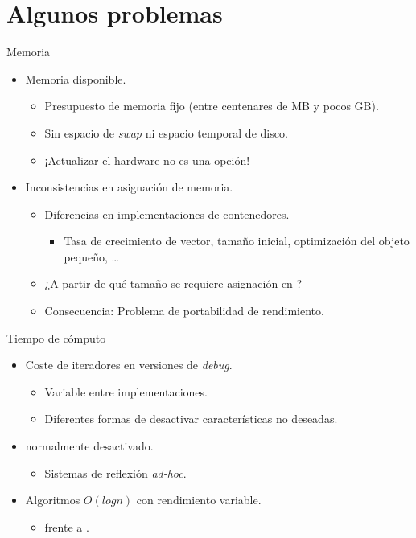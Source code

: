 \section{Algunos problemas}

\begin{frame}[t]{Memoria}
\begin{itemize}
  \item Memoria disponible.
    \begin{itemize}
      \item Presupuesto de memoria fijo (entre centenares de MB y pocos GB).
      \item Sin espacio de \emph{swap} ni espacio temporal de disco.
      \item \alert{¡Actualizar el hardware no es una opción!}
    \end{itemize}
  \vfill\pause
  \item Inconsistencias en asignación de memoria.
    \begin{itemize}
      \item Diferencias en implementaciones de contenedores.
        \begin{itemize}
          \item Tasa de crecimiento de vector, tamaño inicial, optimización del objeto pequeño, \ldots
        \end{itemize}
      \item ¿A partir de qué tamaño se requiere asignación en ?
      \item Consecuencia: Problema de \alert{portabilidad de rendimiento}.
    \end{itemize}
\end{itemize}
\end{frame}

\begin{frame}[t]{Tiempo de cómputo}
\begin{itemize}
  \item Coste de iteradores en versiones de \emph{debug}.
    \begin{itemize}
      \item Variable entre implementaciones.
      \item Diferentes formas de desactivar características no deseadas.
    \end{itemize}
  \vfill\pause
  \item {} normalmente desactivado.
    \begin{itemize}
      \item Sistemas de reflexión \emph{ad-hoc}.
    \end{itemize}
  \vfill\pause
  \item Algoritmos $O(log n)$ con rendimiento variable.
    \begin{itemize}
      \item {} frente a .
    \end{itemize}
\end{itemize}
\end{frame}

